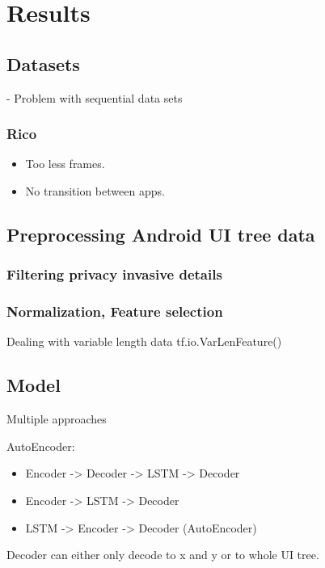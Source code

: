 \chapter{Results}

\section{Datasets}

- Problem with sequential data sets

\subsection{Rico}

\begin{itemize}
  \item Too less frames.
  \item No transition between apps.
\end{itemize}

\section{Preprocessing Android UI tree data}
\subsection{Filtering privacy invasive details}
\subsection{Normalization, Feature selection}

Dealing with variable length data tf.io.VarLenFeature()

\section{Model}


Multiple approaches

AutoEncoder:

\begin{itemize}
  \item Encoder -> Decoder -> LSTM -> Decoder
  \item Encoder -> LSTM -> Decoder
  \item LSTM -> Encoder -> Decoder (AutoEncoder)
\end{itemize}

Decoder can either only decode to x and y or to whole UI tree.

